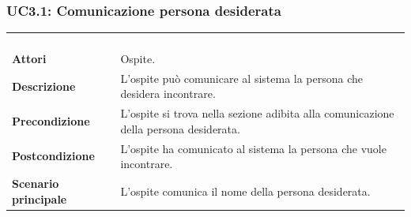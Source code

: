 \subsubsection{UC3.1: Comunicazione persona desiderata}
\label{UC3.1}
\begin{longtable}{l|p{10cm}}
\rowcolor[gray]{0.8} \multicolumn{2}{c}{} \\
\rowcolor[gray]{0.8} \multicolumn{2}{c}{\textbf{UC3.1 - Comunicazione persona desiderata}} \\
\rowcolor[gray]{0.8} \multicolumn{2}{c}{} \\
\hline
&\\
\textbf{Attori} & Ospite.\\[7pt]
\textbf{Descrizione} & L'ospite può comunicare al sistema la persona che desidera incontrare.\\[7pt]
\textbf{Precondizione} & L'ospite si trova nella sezione adibita alla comunicazione della persona desiderata.\\[7pt]
\textbf{Postcondizione} & L'ospite ha comunicato al sistema la persona che vuole incontrare.\\[7pt]
\textbf{Scenario principale} &L'ospite comunica il nome della persona desiderata.\\[7pt]\hline
\end{longtable}

